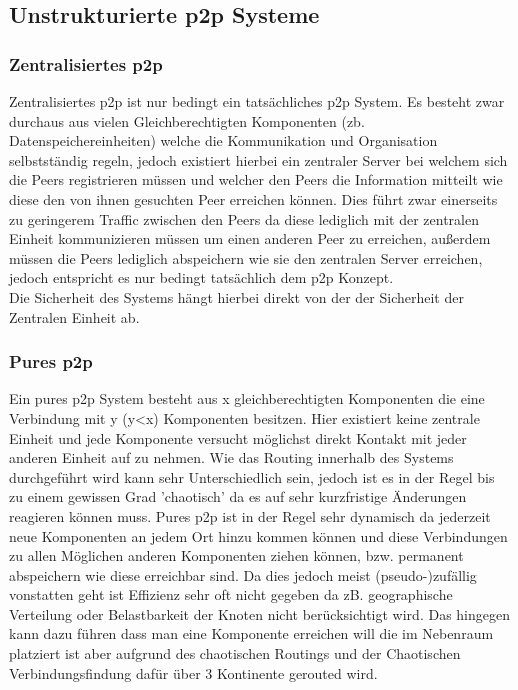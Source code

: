 \documentclass[a4paper,12pt]{scrreprt}
\begin{document}
			\subsection{Unstrukturierte p2p Systeme}
				\subsubsection{Zentralisiertes p2p}
					
					Zentralisiertes p2p ist nur bedingt ein tatsächliches p2p System. Es besteht zwar durchaus aus vielen Gleichberechtigten Komponenten (zb. Datenspeichereinheiten) welche die Kommunikation und Organisation selbstständig regeln, jedoch existiert hierbei ein zentraler Server bei welchem sich die Peers registrieren müssen und welcher den Peers die Information mitteilt wie diese den von ihnen gesuchten Peer erreichen können. Dies führt zwar einerseits zu geringerem Traffic zwischen den Peers da diese lediglich mit der zentralen Einheit kommunizieren müssen um einen anderen Peer zu erreichen, außerdem müssen die Peers lediglich abspeichern wie sie den zentralen Server erreichen, jedoch entspricht es nur bedingt tatsächlich dem p2p Konzept.\\
					Die Sicherheit des Systems hängt hierbei direkt von der der Sicherheit der Zentralen Einheit ab.
					
				\subsubsection{Pures p2p}
					
					Ein pures p2p System besteht aus x gleichberechtigten Komponenten die eine Verbindung mit y (y<x) Komponenten besitzen. Hier existiert keine zentrale Einheit und jede Komponente versucht möglichst direkt Kontakt mit jeder anderen Einheit auf zu nehmen. Wie das Routing innerhalb des Systems durchgeführt wird kann sehr Unterschiedlich sein, jedoch ist es in der Regel bis zu einem gewissen Grad 'chaotisch' da es auf sehr kurzfristige Änderungen reagieren können muss. Pures p2p ist in der Regel sehr dynamisch da jederzeit neue Komponenten an jedem Ort hinzu kommen können und diese Verbindungen zu allen Möglichen anderen Komponenten ziehen können, bzw. permanent abspeichern wie diese erreichbar sind. Da dies jedoch meist (pseudo-)zufällig vonstatten geht ist Effizienz sehr oft nicht gegeben da zB. geographische Verteilung oder Belastbarkeit der Knoten nicht berücksichtigt wird. Das hingegen kann dazu führen dass man eine Komponente erreichen will die im Nebenraum platziert ist aber aufgrund des chaotischen Routings und der Chaotischen Verbindungsfindung dafür über 3 Kontinente gerouted wird.
					
\end{document}
